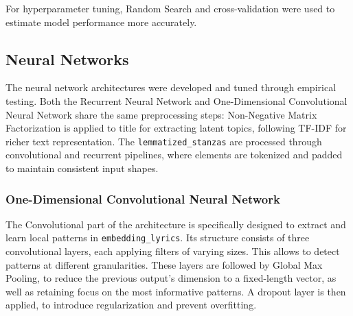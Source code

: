 For hyperparameter tuning, Random Search and cross-validation were used to
estimate model performance more accurately.



\subsection*{Neural Networks}

The neural network architectures were developed and tuned through empirical
testing. Both the Recurrent
Neural Network and One-Dimensional Convolutional Neural Network share the same
preprocessing steps: Non-Negative Matrix Factorization is applied to title
for extracting latent topics, following TF-IDF for richer text representation.
The \texttt{lemmatized\_stanzas} are processed through convolutional and
recurrent pipelines, where elements are tokenized and padded to maintain
consistent input shapes.

\subsubsection*{One-Dimensional Convolutional Neural Network}
The Convolutional part of the architecture is specifically designed to extract and learn
local patterns in \texttt{embedding\_lyrics}.
Its structure consists of three convolutional layers, each applying filters of
varying sizes. This allows to detect patterns at different granularities.
These layers are followed by Global Max Pooling, to reduce the previous output's
dimension to a fixed-length vector, as well as retaining focus on the most
informative patterns.
A dropout layer is then applied, to introduce regularization and prevent
overfitting.

